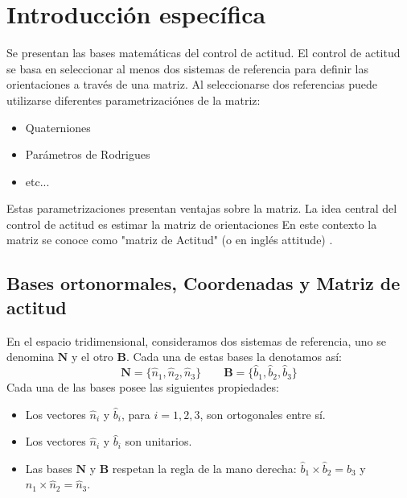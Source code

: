 \chapter{Introducción específica} %

\label{Chapter2}

Se presentan las bases matemáticas del control de actitud. El control de actitud se basa en seleccionar al menos dos sistemas de referencia para definir las orientaciones a través de una matriz. Al seleccionarse dos referencias puede utilizarse diferentes parametrizaciónes de la matriz: 
\begin{itemize}
	\item Quaterniones
	\item Parámetros de Rodrigues
	\item etc... 
\end{itemize}
Estas parametrizaciones presentan ventajas sobre la matriz. La idea central del control de actitud es estimar la matriz de orientaciones En este contexto la matriz se conoce como "matriz de Actitud" (o en inglés attitude) \citep{ARTICLE:1}. 
 
 
 
 

\section{Bases ortonormales, Coordenadas y Matriz de actitud}
\label{sec:matriz_actitud}
En el espacio tridimensional, consideramos dos sistemas de referencia, uno se denomina $\mathbf{N}$ y el otro $\mathbf{B}$. Cada una de estas bases  la denotamos así: 
\begin{equation}
	\mathbf{N} = \{ \hat{n}_1, \hat{n}_2, \hat{n}_3 \}
	\qquad
	\mathbf{B} = \{ \hat{b}_1, \hat{b}_2, \hat{b}_3 \}
\end{equation}
Cada una de las bases posee las siguientes propiedades: 

\begin{itemize}
\item Los vectores $\hat{n}_i$ y $\hat{b}_i$, para $i = 1, 2, 3$, son ortogonales entre sí.
\item Los vectores $\hat{n}_i$ y $\hat{b}_i$ son unitarios.
\item Las bases $\mathbf{N}$ y $\mathbf{B}$ respetan la regla de la mano derecha: 
$\hat{b}_1 \times \hat{b}_2 = \hat{b}_3$ y $\hat{n}_1 \times \hat{n}_2 = \hat{n}_3$.
\end{itemize}



